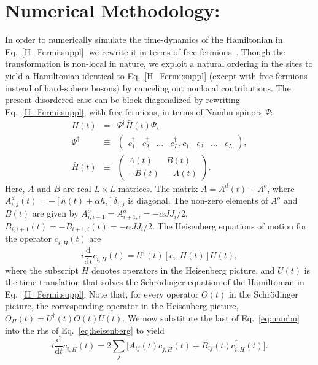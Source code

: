 \documentclass[aps,prl, notitlepage]{revtex4-1}
\begin{document}
\section{\sc Numerical Methodology:}
In order to numerically simulate the time-dynamics of the Hamiltonian in Eq.~\ref{H_Fermi:suppl}, we rewrite it in terms of free fermions~\cite{Lieb}. Though the transformation is non-local in nature, we exploit a natural ordering in the sites to yield a Hamiltonian identical to Eq.~\ref{H_Fermi:suppl} (except with free fermions instead of hard-sphere bosons)  by canceling out nonlocal contributions. The present disordered case can be block-diagonalized by rewriting Eq.~\ref{H_Fermi:suppl}, with free fermions, in terms of Nambu spinors $\Psi$:
\begin{eqnarray}
\label{eq:nambu}
{H}(t) &=& \Psi^\dagger \bar{H}(t) \Psi , \nonumber \\
\Psi^\dagger &\equiv& \begin{pmatrix}
                  c^\dagger_1 & c^\dagger_2 & \dots & c^\dagger_L,c^{\;}_1 & c^{\;}_2 & \dots & c^{\;}_L  
                 \end{pmatrix}, \nonumber \\
\bar{H}(t) &\equiv& \begin{pmatrix}
                A(t) & B(t) \\
                -B(t) & -A(t) 
               \end{pmatrix}.
\end{eqnarray}
Here, $A$ and $B$ are real $L\times L$ matrices. The matrix $A=A^d(t)+A^o$, where $A^d_{i,j}(t)=-\left[h(t)+\alpha h_i\right]\delta_{i,j}$ is diagonal. The non-zero elements of $A^o$ and $B(t)$ are given by $A^o_{i,i+1}=A^o_{i+1,i}=-\alpha J J_i /2$, $B_{i,i+1}(t)=-B_{i+1,i}(t)=-\alpha J J_i/2$. The Heisenberg equations of motion for the operator $c^{\;}_{i,H}(t)$ are
\begin{equation}
\label{eq:heisenberg}
i \frac{\mathrm{d}}{\mathrm{d} t}c^{\;}_{i,H}(t) = U^\dagger(t)\left[c_i,H(t)\right]U(t),
\end{equation}
where the subscript $H$ denotes operators in the Heisenberg picture, and  $U(t)$ is the time translation that solves the Schr\"odinger equation of the Hamiltonian in Eq.~\ref{H_Fermi:suppl}. Note that, for every operator $O(t)$ in the Schr\"odinger picture, the corresponding operator in the Heisenberg picture, $O_H(t)=U^\dagger(t) O(t) U(t)$. We now substitute the last of Eq.~\ref{eq:nambu} into the rhs of Eq.~\ref{eq:heisenberg} to yield
\begin{equation}
\label{eq:dyn}
i \frac{\mathrm{d}}{\mathrm{d} t}c^{\;}_{i,H}(t) =  2\sum_j \bigg[A_{ij}(t)c^{\;}_{j,H}(t)+ B_{ij}(t)c^{\dagger}_{i,H}(t)\bigg].
\end{equation}
\end{document}
